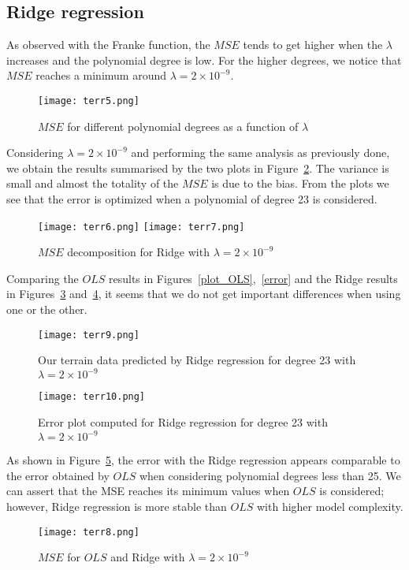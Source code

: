 \documentclass{emulateapj}
\begin{document}
\subsection{Ridge regression}
As observed with the Franke function, the $MSE$ tends to get higher when the $\lambda$ increases and the polynomial degree is low. For the higher degrees, we notice that $MSE$ reaches a minimum around $\lambda=2\times10^{-9}$.
\begin{figure}[H]
    \centering
    \texttt{[image: terr5.png]}
    \caption{$MSE$ for different polynomial degrees as a function of $\lambda$}
    \label{ridge_terr_1}
\end{figure}
Considering $\lambda=2\times10^{-9}$ and performing the same analysis as previously done, we obtain the results summarised by the two plots in Figure~\ref{ridge_terr_2}. The variance is small and almost the totality of the $MSE$ is due to the bias. From the plots we see that the error is optimized when a polynomial of degree 23 is considered.
\begin{figure}[H]
    \centering
    \texttt{[image: terr6.png]}
    \texttt{[image: terr7.png]}
    \caption{$MSE$ decomposition for Ridge with $\lambda=2\times10^{-9}$}
    \label{ridge_terr_2}
\end{figure}
Comparing the $OLS$ results in Figures~\ref{plot_OLS},~\ref{error} and the Ridge results in Figures~\ref{ridge_terr_3} and~\ref{ridge_terr_34}, it seems that we do not get important differences when using one or the other.
\begin{figure}[H]
    \centering
    \texttt{[image: terr9.png]}
    \caption{Our terrain data predicted by Ridge regression for degree 23 with $\lambda=2\times10^{-9}$ }
    \label{ridge_terr_3}
\end{figure}
\begin{figure}[H]
\centering
    \texttt{[image: terr10.png]}
    \caption{Error plot computed for Ridge regression for degree 23 with $\lambda=2\times10^{-9}$ }
    \label{ridge_terr_34}
\end{figure}
As shown in Figure~\ref{ridge_terr_4}, the error with the Ridge regression appears comparable to the error obtained by $OLS$ when considering polynomial degrees less than 25. We can assert that the MSE reaches its minimum values when $OLS$ is considered; however, Ridge regression is more stable than $OLS$ with higher model complexity.

\begin{figure}[H]
    \centering
    \texttt{[image: terr8.png]}
    \caption{$MSE$ for $OLS$ and Ridge with $\lambda=2\times10^{-9}$ }
    \label{ridge_terr_4}
\end{figure}
\end{document}
